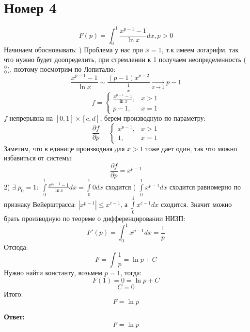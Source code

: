 \documentclass[a4paper,12pt]{article}
\begin{document}
\section*{Номер 4}
\[
F(p) = \int_0^1 \frac{x^{p-1} - 1}{\ln x} dx, p  > 0 
\]
Начинаем обосновывать:
) Проблема у нас при $x = 1$, т.к имеем логарифм, так что нужно будет доопределить, при стремлении к 1 получаем неопределенность ($\frac{0}{0}$), поэтому посмотрим по Лопиталю:
\[
 \frac{x^{p-1} - 1}{\ln x} \sim  \frac{(p-1)x^{p-2}}{\frac{1}{x}} \underset{x \rightarrow 1}{\longrightarrow} p - 1
\]
\[
f =
\begin{cases}
 \frac{x^{p-1} - 1}{\ln x}, &x > 1 \\
p - 1 , & x = 1
\end{cases}
\]
$f$ непрерывна на $[0, 1] \times [c, d]$, берем производную по параметру:
\[
\frac{\partial f}{\partial p} = 
\begin{cases}
x^{p-1}, &x > 1 \\
1, &x = 1
\end{cases}
\]
Заметим, что в единице производная для $x > 1$ тоже дает один, так что можно избавиться от системы:
\[
\frac{\partial f}{\partial p}
= x^{p-1}
\]
2) $\exists \; p_0 = 1 : \; \int\limits_0^1 \frac{x^{p_0 - 1} - 1}{ \ln x } dx = \int\limits_0^1 0 dx$ сходится
) $\int\limits_0^1 x^{p-1} dx$ сходится равномерно по признаку Вейерштрасса:  $|x^{p-1}| \leq x^{c - 1} $, а $\int\limits_0^1 x^{c-1} dx$ сходится. Значит можно брать производную по теореме о дифференцировании НИЗП:
\[
F'(p) = \int_0^1 x^{p-1} dx  = \frac{1}{p}
\]
Отсюда:
\[
F = \int  \frac{1}{p} = \ln p + C
\]
Нужно найти константу, возьмем $p = 1$, тогда:
\[
F(1) = 0 = \ln p + C
\]
\[
C = 0
\]
Итого:
\[
F = \ln p
\]
\begin{center}
\textbf{Ответ: } 
\[
F = \ln p
\]
\end{center}
\end{document}
